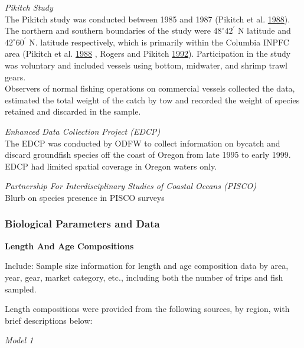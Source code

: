 \documentclass[12pt,]{article}
\begin{document}
\emph{Pikitch Study}\\
The Pikitch study was conducted between 1985 and 1987 (Pikitch et al.
\protect\hyperlink{ref-Pikitch1988}{1988}). The northern and southern
boundaries of the study were \(48^\circ 42^\prime\) N latitude and
\(42^\circ 60^\prime\) N. latitude respectively, which is primarily
within the Columbia INPFC area (Pikitch et al.
\protect\hyperlink{ref-Pikitch1988}{1988} , Rogers and Pikitch
\protect\hyperlink{ref-Rogers1992}{1992}). Participation in the study
was voluntary and included vessels using bottom, midwater, and shrimp
trawl gears.\\
Observers of normal fishing operations on commercial vessels collected
the data, estimated the total weight of the catch by tow and recorded
the weight of species retained and discarded in the sample.

\emph{Enhanced Data Collection Project (EDCP)}\\
The EDCP was conducted by ODFW to collect information on bycatch and
discard groundfish species off the coast of Oregon from late 1995 to
early 1999.\\
EDCP had limited spatial coverage in Oregon waters only.

\emph{Partnership For Interdisciplinary Studies of Coastal Oceans
(PISCO)}\\
Blurb on species presence in PISCO surveys

\subsubsection{Biological Parameters and
Data}\label{biological-parameters-and-data}

\textbf{Length And Age Compositions}

Include: Sample size information for length and age composition data by
area, year, gear, market category, etc., including both the number of
trips and fish sampled.

Length compositions were provided from the following sources, by region,
with brief descriptions below:

\emph{Model 1}
\end{document}
